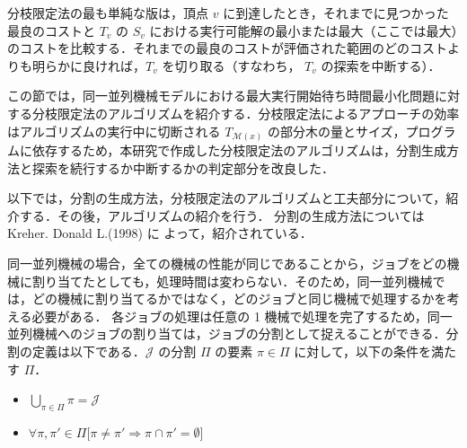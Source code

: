 \documentclass[12pt]{optlab-bachelor}
\begin{document}
分枝限定法の最も単純な版は，頂点 $v$ に到達したとき，それまでに見つかった最良のコストと $T_v$
の $S_v$ における実行可能解の最小または最大（ここでは最大）のコストを比較する．それまでの最良のコストが評価された範囲のどのコストよりも明らかに良ければ，$T_v$ を切り取る（すなわち， $T_v$ の探索を中断する）．


この節では，同一並列機械モデルにおける最大実行開始待ち時間最小化問題に対する分枝限定法のアルゴリズムを紹介する．分枝限定法によるアプローチの効率はアルゴリズムの実行中に切断される $T_{\mathcal{M}(x)}$ の部分木の量とサイズ，プログラムに依存するため，本研究で作成した分枝限定法のアルゴリズムは，分割生成方法と探索を続行するか中断するかの判定部分を改良した．%

以下では，分割の生成方法，分枝限定法のアルゴリズムと工夫部分について，紹介する．その後，アルゴリズムの紹介を行う．
分割の生成方法については Kreher. Donald L.(1998) \cite{Partition} に
よって，紹介されている．

同一並列機械の場合，全ての機械の性能が同じであることから，ジョブをどの機械に割り当てたとしても，処理時間は変わらない．そのため，同一並列機械では，どの機械に割り当てるかではなく，どのジョブと同じ機械で処理するかを考える必要がある．
各ジョブの処理は任意の 1 機械で処理を完了するため，同一並列機械へのジョブの割り当ては，ジョブの分割として捉えることができる．分割の定義は以下である．$\mathcal{J}$ の分割 $\Pi$ の要素 $\pi \in \Pi$ に対して，以下の条件を満たす $\Pi$．
\begin{itemize}
  \item $\displaystyle \bigcup_{\pi \in \Pi}\pi = \mathcal{J} $
  \item $\forall \pi, \pi' \in \Pi \big[\pi \neq \pi' \Rightarrow \pi \cap \pi' = \emptyset \big]$
\end{itemize}
\end{document}
